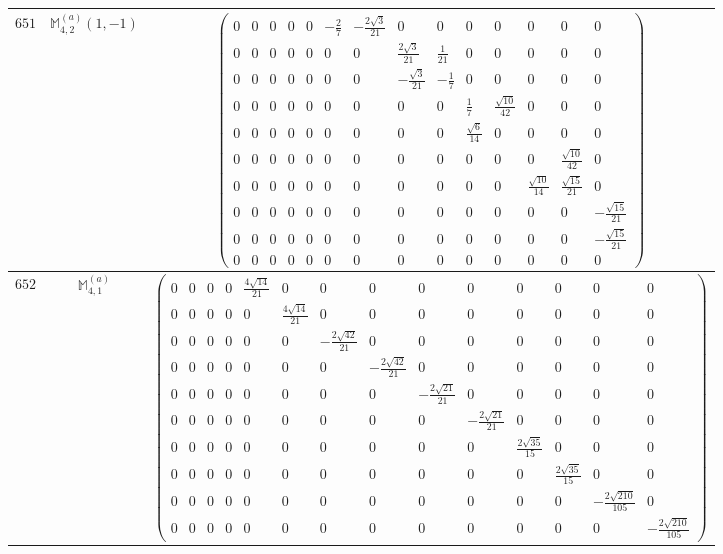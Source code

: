 \documentclass[fleqn,8pt,landscape]{jsarticle}
\begin{document}
\begin{center}
\begin{longtable}{ccc}
$ 651 $ & $ \mathbb{M}_{4,2}^{(a)}(1,-1) $ & $ \begin{pmatrix} 0 & 0 & 0 & 0 & 0 & - \frac{2}{7} & - \frac{2 \sqrt{3}}{21} & 0 & 0 & 0 & 0 & 0 & 0 & 0 \\ 0 & 0 & 0 & 0 & 0 & 0 & 0 & \frac{2 \sqrt{3}}{21} & \frac{1}{21} & 0 & 0 & 0 & 0 & 0 \\ 0 & 0 & 0 & 0 & 0 & 0 & 0 & - \frac{\sqrt{3}}{21} & - \frac{1}{7} & 0 & 0 & 0 & 0 & 0 \\ 0 & 0 & 0 & 0 & 0 & 0 & 0 & 0 & 0 & \frac{1}{7} & \frac{\sqrt{10}}{42} & 0 & 0 & 0 \\ 0 & 0 & 0 & 0 & 0 & 0 & 0 & 0 & 0 & \frac{\sqrt{6}}{14} & 0 & 0 & 0 & 0 \\ 0 & 0 & 0 & 0 & 0 & 0 & 0 & 0 & 0 & 0 & 0 & 0 & \frac{\sqrt{10}}{42} & 0 \\ 0 & 0 & 0 & 0 & 0 & 0 & 0 & 0 & 0 & 0 & 0 & \frac{\sqrt{10}}{14} & \frac{\sqrt{15}}{21} & 0 \\ 0 & 0 & 0 & 0 & 0 & 0 & 0 & 0 & 0 & 0 & 0 & 0 & 0 & - \frac{\sqrt{15}}{21} \\ 0 & 0 & 0 & 0 & 0 & 0 & 0 & 0 & 0 & 0 & 0 & 0 & 0 & - \frac{\sqrt{15}}{21} \\ 0 & 0 & 0 & 0 & 0 & 0 & 0 & 0 & 0 & 0 & 0 & 0 & 0 & 0 \end{pmatrix} $ \\ \hline
$ 652 $ & $ \mathbb{M}_{4,1}^{(a)} $ & $ \begin{pmatrix} 0 & 0 & 0 & 0 & \frac{4 \sqrt{14}}{21} & 0 & 0 & 0 & 0 & 0 & 0 & 0 & 0 & 0 \\ 0 & 0 & 0 & 0 & 0 & \frac{4 \sqrt{14}}{21} & 0 & 0 & 0 & 0 & 0 & 0 & 0 & 0 \\ 0 & 0 & 0 & 0 & 0 & 0 & - \frac{2 \sqrt{42}}{21} & 0 & 0 & 0 & 0 & 0 & 0 & 0 \\ 0 & 0 & 0 & 0 & 0 & 0 & 0 & - \frac{2 \sqrt{42}}{21} & 0 & 0 & 0 & 0 & 0 & 0 \\ 0 & 0 & 0 & 0 & 0 & 0 & 0 & 0 & - \frac{2 \sqrt{21}}{21} & 0 & 0 & 0 & 0 & 0 \\ 0 & 0 & 0 & 0 & 0 & 0 & 0 & 0 & 0 & - \frac{2 \sqrt{21}}{21} & 0 & 0 & 0 & 0 \\ 0 & 0 & 0 & 0 & 0 & 0 & 0 & 0 & 0 & 0 & \frac{2 \sqrt{35}}{15} & 0 & 0 & 0 \\ 0 & 0 & 0 & 0 & 0 & 0 & 0 & 0 & 0 & 0 & 0 & \frac{2 \sqrt{35}}{15} & 0 & 0 \\ 0 & 0 & 0 & 0 & 0 & 0 & 0 & 0 & 0 & 0 & 0 & 0 & - \frac{2 \sqrt{210}}{105} & 0 \\ 0 & 0 & 0 & 0 & 0 & 0 & 0 & 0 & 0 & 0 & 0 & 0 & 0 & - \frac{2 \sqrt{210}}{105} \end{pmatrix} $ \\ \hline

\end{longtable}
\end{center}
\end{document}
